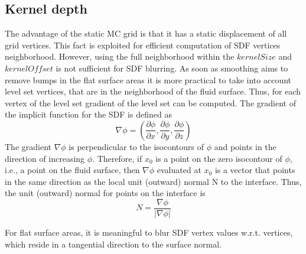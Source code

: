 \subsection{Kernel depth}
The advantage of the static MC grid is that it has a static displacement of all grid vertices. This fact is exploited for efficient computation of SDF vertices neighborhood. However, using the full neighborhood within the $kernelSize$ and $kernelOffset$ is not sufficient for SDF blurring. As soon as smoothing aims to remove bumps in the flat surface areas it is more practical to take into account level set vertices, that are in the neighborhood of the fluid surface. Thus, for each vertex of the level set gradient of the level set can be computed.
The gradient of the implicit function for the SDF is defined as
\begin{equation}
	\nabla\phi = \left( \dfrac{\partial\phi}{\partial x}, \dfrac{\partial\phi}{\partial y}, \dfrac{\partial\phi}{\partial z}\right)
\end{equation}
The gradient $\nabla\phi$ is perpendicular to the isocontours of $\phi$ and points in the
direction of increasing $\phi$. Therefore, if $x_0$ is a point on the zero isocontour
of $\phi$, i.e., a point on the fluid surface, then $\nabla\phi$ evaluated at $x_0$ is a vector that points in the same direction as the local unit (outward) normal N to the interface. Thus, the unit (outward) normal for points on the interface is \cite{LevelSetMethods}
\begin{equation}
	N = \dfrac{\nabla\phi}{|\nabla \phi|}
\end{equation}

For flat surface areas, it is meaningful to blur SDF vertex values w.r.t. vertices, which reside in a tangential direction to the surface normal.

